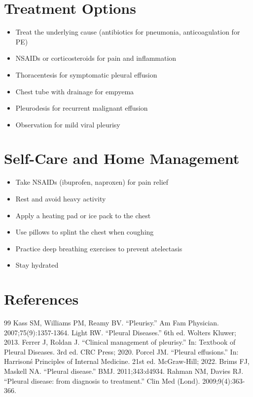 \section*{Treatment Options}
\begin{itemize}
\item Treat the underlying cause (antibiotics for pneumonia, anticoagulation for PE)
\item NSAIDs or corticosteroids for pain and inflammation
\item Thoracentesis for symptomatic pleural effusion
\item Chest tube with drainage for empyema
\item Pleurodesis for recurrent malignant effusion
\item Observation for mild viral pleurisy
\end{itemize}

\section*{Self-Care and Home Management}
\begin{itemize}
\item Take NSAIDs (ibuprofen, naproxen) for pain relief
\item Rest and avoid heavy activity
\item Apply a heating pad or ice pack to the chest
\item Use pillows to splint the chest when coughing
\item Practice deep breathing exercises to prevent atelectasis
\item Stay hydrated
\end{itemize}

\section*{References}
\begin{thebibliography}{99}
 Kass SM, Williams PM, Reamy BV. ``Pleurisy.'' Am Fam Physician. 2007;75(9):1357-1364.
 Light RW. ``Pleural Diseases.'' 6th ed. Wolters Kluwer; 2013.
 Ferrer J, Roldan J. ``Clinical management of pleurisy.'' In: Textbook of Pleural Diseases. 3rd ed. CRC Press; 2020.
 Porcel JM. ``Pleural effusions.'' In: Harrison\'s Principles of Internal Medicine. 21st ed. McGraw-Hill; 2022.
 Brims FJ, Maskell NA. ``Pleural disease.'' BMJ. 2011;343:d4934.
 Rahman NM, Davies RJ. ``Pleural disease: from diagnosis to treatment.'' Clin Med (Lond). 2009;9(4):363-366.
\end{thebibliography}
